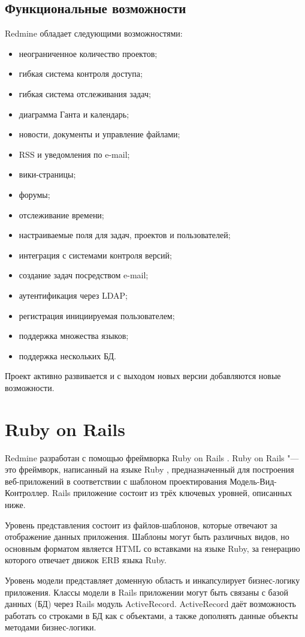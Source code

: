 \subsection{Функциональные возможности}
Redmine обладает следующими возможностями:
\begin{itemize}
  \item неограниченное количество проектов;
  \item гибкая система контроля доступа;
  \item гибкая система отслеживания задач;
  \item диаграмма Ганта и календарь;
  \item новости, документы и управление файлами;
  \item RSS и уведомления по e-mail;
  \item вики-страницы;
  \item форумы;
  \item отслеживание времени;
  \item настраиваемые поля для задач, проектов и пользователей;
  \item интеграция с системами контроля версий;
  \item создание задач посредством e-mail;
  \item аутентификация через LDAP;
  \item регистрация инициируемая пользователем;
  \item поддержка множества языков;
  \item поддержка нескольких БД.
\end{itemize}
Проект активно развивается и с выходом новых версии добавляются новые
возможности.

\section{Ruby on Rails}
Redmine разработан с помощью фреймворка Ruby on Rails \cite{rails}. Ruby on
Rails "--- это фреймворк, написанный на языке Ruby \cite{ruby}, предназначенный
для построения веб-приложений в соответствии с шаблоном проектирования
Модель-Вид-Контроллер. Rails приложение состоит из трёх ключевых уровней,
описанных ниже.

Уровень представления состоит из файлов-шаблонов, которые отвечают за
отображение данных приложения. Шаблоны могут быть различных видов, но основным
форматом является HTML со вставками на языке Ruby, за генерацию которого
отвечает движок ERB языка Ruby.

Уровень модели представляет доменную область и инкапсулирует бизнес-логику
приложения. Классы модели в Rails приложении могут быть связаны с базой данных
(БД) через Rails модуль ActiveRecord. ActiveRecord даёт возможность работать со
строками в БД как с объектами, а также дополнять данные объекты методами
бизнес-логики.

